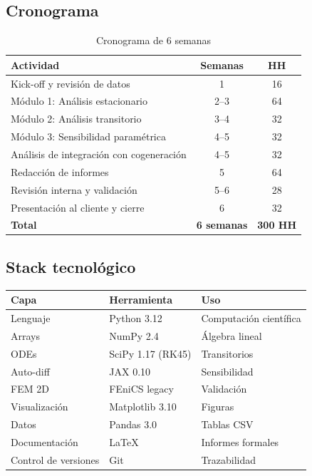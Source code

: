 \documentclass[11pt,a4paper]{article}
\begin{document}
\subsection{Cronograma}

\begin{table}[H]
\centering
\caption{Cronograma de 6 semanas}
\begin{tabular}{@{}lcc@{}}
\toprule
\textbf{Actividad} & \textbf{Semanas} & \textbf{HH} \\
\midrule
Kick-off y revisión de datos & 1 & 16 \\
Módulo 1: Análisis estacionario & 2--3 & 64 \\
Módulo 2: Análisis transitorio & 3--4 & 32 \\
Módulo 3: Sensibilidad paramétrica & 4--5 & 32 \\
Análisis de integración con cogeneración & 4--5 & 32 \\
Redacción de informes & 5 & 64 \\
Revisión interna y validación & 5--6 & 28 \\
Presentación al cliente y cierre & 6 & 32 \\
\midrule
\textbf{Total} & \textbf{6 semanas} & \textbf{300 HH} \\
\bottomrule
\end{tabular}
\end{table}

\subsection{Stack tecnológico}

\begin{table}[H]
\centering
\begin{tabular}{@{}lll@{}}
\toprule
\textbf{Capa} & \textbf{Herramienta} & \textbf{Uso} \\
\midrule
Lenguaje & Python 3.12 & Computación científica \\
Arrays & NumPy 2.4 & Álgebra lineal \\
ODEs & SciPy 1.17 (RK45) & Transitorios \\
Auto-diff & JAX 0.10 & Sensibilidad \\
FEM 2D & FEniCS legacy & Validación \\
Visualización & Matplotlib 3.10 & Figuras \\
Datos & Pandas 3.0 & Tablas CSV \\
Documentación & LaTeX & Informes formales \\
Control de versiones & Git & Trazabilidad \\
\bottomrule
\end{tabular}
\end{table}
\end{document}
